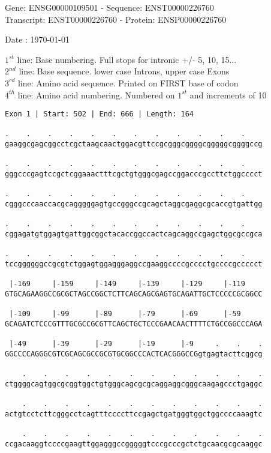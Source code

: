 \documentclass{article}
\begin{document}
\begin{center}
\begin{large}
Gene: ENSG00000109501 - Sequence: ENST00000226760\\
Transcript: ENST00000226760 - Protein: ENSP00000226760
 
 Date : \today
\end{large}
\end{center}
$1^{st}$ line: Base numbering. Full stops for intronic +/- 5, 10, 15...\\
$2^{nd}$ line: Base sequence. lower case Introns, upper case Exons\\
$3^{rd}$ line: Amino acid sequence. Printed on FIRST base of codon\\
$4^{th}$ line: Amino acid numbering. Numbered on $1^{st}$ and increments of 10\\
\begin{Verbatim}[fontfamily=courier]
Exon 1 | Start: 502 | End: 666 | Length: 164

.    .    .    .    .    .    .    .    .    .    .    .    
gaaggcgagcggcctcgctaagcaactggacgttccgcgggcggggcgggggcggggccg

.    .    .    .    .    .    .    .    .    .    .    .    
gggcccgagtccgctcggaaactttcgctgtgggcgagccggacccgccttctggcccct

.    .    .    .    .    .    .    .    .    .    .    .    
cgggcccaaccacgcagggggagtgccgggccgcagctaggcgaggcgcaccgtgattgg

.    .    .    .    .    .    .    .    .    .    .    .    
cggagatgtggagtgattggcggctacaccggccactcagcaggccgagctggcgccgca

.    .    .    .    .    .    .    .    .    .    .    .    
tccggggggccgcgtctggagtggagggaggccgaaggccccgcccctgccccgccccct

 |-169     |-159     |-149     |-139     |-129     |-119    
GTGCAGAAGGCCGCGCTAGCCGGCTCTTCAGCAGCGAGTGCAGATTGCTCCCCCGCGGCC

 |-109     |-99      |-89      |-79      |-69      |-59     
GCAGATCTCCCGTTTGCGCCGCGTTCAGCTGCTCCCGAACAACTTTTCTGCCGGCCCAGA

 |-49      |-39      |-29      |-19      |-9     .    .    .
GGCCCCAGGGCGTCGCAGCGCCGCGTGCGGCCCACTCACGGGCCGgtgagtacttcggcg

    .    .    .    .    .    .    .    .    .    .    .    .
ctggggcagtggcgcggtggctgtgggcagcgcgcaggaggcgggcaagagccctgaggc

    .    .    .    .    .    .    .    .    .    .    .    .
actgtcctcttcgggcctcagtttccccttccgagctgatgggtggctggccccaaagtc

    .    .    .    .    .    .    .    .    .    .    .    .
ccgacaaggtccccgaagttggagggccgggggtcccgcccgctctgcaacgcgcaaggc

\end{Verbatim}
\end{document}
